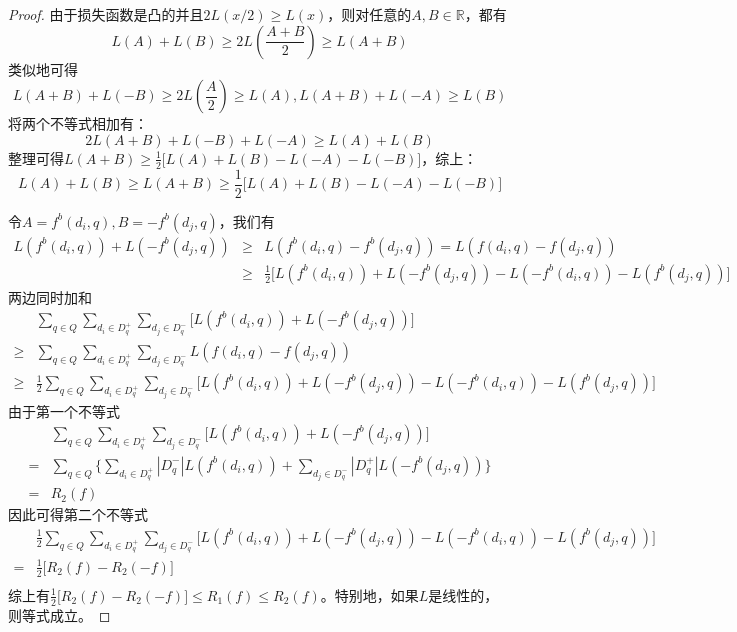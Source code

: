 \begin{proof}
由于损失函数是凸的并且$2L(x/2)\ge L(x)$，则对任意的$A,B\in \mathbb{R}$，都有
\[
    L(A) + L(B) \ge 2L(\frac{A+B}{2})\ge L(A+B)
\]
类似地可得
\[
    L(A+B) + L(-B) \ge 2L(\frac{A}{2})\ge L(A), L(A+B) + L(-A) \ge L(B)
\]
将两个不等式相加有：
\[
    2L(A+B) + L(-B) + L(-A) \ge L(A) + L(B)
\]
整理可得$L(A+B) \ge \frac{1}{2} \big[L(A) + L(B) - L(-A) - L(-B)\big]$，综上：
\begin{equation}
    L(A) + L(B) \ge L(A+B) \ge \frac{1}{2} \big[L(A) + L(B) - L(-A) - L(-B)\big]
\end{equation}

令$A=f^b(d_i,q),B=-f^b(d_j,q)$，我们有
\begin{equation}
    \begin{array}{lll}
      L(f^b(d_i,q)) + L(-f^b(d_j,q)) & \ge & L(f^b(d_i,q)-f^b(d_j,q)) = L(f(d_i,q)-f(d_j,q))\\
       & \ge & \frac{1}{2} \big[L(f^b(d_i,q)) + L(-f^b(d_j,q)) - L(-f^b(d_i,q)) - L(f^b(d_j,q))\big]
    \end{array}
\end{equation}
两边同时加和
\begin{equation}
    \begin{array}{ll}
       & \sum\limits_{q\in Q} \sum\limits_{d_i\in D_q^+} \sum\limits_{d_j\in D_q^-} \big[L(f^b(d_i,q)) + L(-f^b(d_j,q))\big]\\
       \ge & \sum\limits_{q\in Q} \sum\limits_{d_i\in D_q^+} \sum\limits_{d_j\in D_q^-} L(f(d_i,q)-f(d_j,q))\\
       \ge & \frac{1}{2} \sum\limits_{q\in Q} \sum\limits_{d_i\in D_q^+} \sum\limits_{d_j\in D_q^-} \big[L(f^b(d_i,q)) + L(-f^b(d_j,q)) - L(-f^b(d_i,q)) - L(f^b(d_j,q))\big]
    \end{array}
\end{equation}
由于第一个不等式
\begin{equation}
    \begin{array}{ll}
        & \sum\limits_{q\in Q} \sum\limits_{d_i\in D_q^+} \sum\limits_{d_j\in D_q^-} \big[L(f^b(d_i,q)) + L(-f^b(d_j,q))\big] \\
      = & \sum\limits_{q\in Q} \big\{\sum\limits_{d_i\in D_q^+}|D_q^-| L(f^b(d_i,q))+\sum\limits_{d_j\in D_q^-}|D_q^+|L(-f^b(d_j,q))\big\} \\
      = & R_2(f)
    \end{array}
\end{equation}
因此可得第二个不等式
\begin{equation}
    \begin{array}{ll}
        & \frac{1}{2} \sum\limits_{q\in Q} \sum\limits_{d_i\in D_q^+} \sum\limits_{d_j\in D_q^-} \big[L(f^b(d_i,q)) + L(-f^b(d_j,q)) - L(-f^b(d_i,q)) - L(f^b(d_j,q))\big] \\
      = & \frac{1}{2} \big[R_2(f) - R_2(-f)\big] \\
    \end{array}
\end{equation}
综上有$\frac{1}{2} \big[R_2(f) - R_2(-f)\big] \le R_1(f) \le R_2(f)$。特别地，如果$L$是线性的，则等式成立。
\end{proof}


